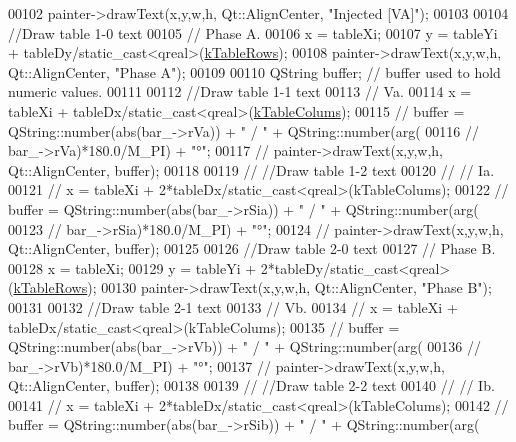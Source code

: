 \begin{DoxyCode}
00102   painter->drawText(x,y,w,h, Qt::AlignCenter, \textcolor{stringliteral}{"Injected [VA]"});
00103 
00104   \textcolor{comment}{//Draw table 1-0 text}
00105   \textcolor{comment}{// Phase A.}
00106   x = tableXi;
00107   y = tableYi + tableDy/\textcolor{keyword}{static\_cast<}qreal\textcolor{keyword}{>}(\hyperlink{class_info_bar_ad54d2dd19a63caf9d2476aace60ae3c5}{kTableRows});
00108   painter->drawText(x,y,w,h, Qt::AlignCenter, \textcolor{stringliteral}{"Phase A"});
00109 
00110   QString buffer; \textcolor{comment}{// buffer used to hold numeric values.}
00111 
00112   \textcolor{comment}{//Draw table 1-1 text}
00113   \textcolor{comment}{// Va.}
00114   x = tableXi + tableDx/\textcolor{keyword}{static\_cast<}qreal\textcolor{keyword}{>}(\hyperlink{class_info_bar_a57e9e7c40a6fd2a56dd47a4512d65489}{kTableColums});
00115 \textcolor{comment}{//  buffer = QString::number(abs(bar\_->rVa)) + " / " + QString::number(arg(}
00116 \textcolor{comment}{//             bar\_->rVa)*180.0/M\_PI) + "°";}
00117 \textcolor{comment}{//  painter->drawText(x,y,w,h, Qt::AlignCenter, buffer);}
00118 
00119 \textcolor{comment}{//  //Draw table 1-2 text}
00120 \textcolor{comment}{//  // Ia.}
00121 \textcolor{comment}{//  x = tableXi + 2*tableDx/static\_cast<qreal>(kTableColums);}
00122 \textcolor{comment}{//  buffer = QString::number(abs(bar\_->rSia)) + " / " + QString::number(arg(}
00123 \textcolor{comment}{//             bar\_->rSia)*180.0/M\_PI) + "°";}
00124 \textcolor{comment}{//  painter->drawText(x,y,w,h, Qt::AlignCenter, buffer);}
00125 
00126   \textcolor{comment}{//Draw table 2-0 text}
00127   \textcolor{comment}{// Phase B.}
00128   x = tableXi;
00129   y = tableYi + 2*tableDy/\textcolor{keyword}{static\_cast<}qreal\textcolor{keyword}{>}(\hyperlink{class_info_bar_ad54d2dd19a63caf9d2476aace60ae3c5}{kTableRows});
00130   painter->drawText(x,y,w,h, Qt::AlignCenter, \textcolor{stringliteral}{"Phase B"});
00131 
00132   \textcolor{comment}{//Draw table 2-1 text}
00133   \textcolor{comment}{// Vb.}
00134 \textcolor{comment}{//  x = tableXi + tableDx/static\_cast<qreal>(kTableColums);}
00135 \textcolor{comment}{//  buffer = QString::number(abs(bar\_->rVb)) + " / " + QString::number(arg(}
00136 \textcolor{comment}{//             bar\_->rVb)*180.0/M\_PI) + "°";}
00137 \textcolor{comment}{//  painter->drawText(x,y,w,h, Qt::AlignCenter, buffer);}
00138 
00139 \textcolor{comment}{//  //Draw table 2-2 text}
00140 \textcolor{comment}{//  // Ib.}
00141 \textcolor{comment}{//  x = tableXi + 2*tableDx/static\_cast<qreal>(kTableColums);}
00142 \textcolor{comment}{//  buffer = QString::number(abs(bar\_->rSib)) + " / " + QString::number(arg(}

\end{DoxyCode}
